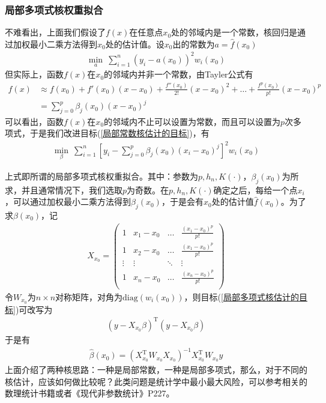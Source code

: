         \subsubsection{局部多项式核权重拟合}
            \par
            不难看出，上面我们假设了$f(x)$在任意点$x_0$处的邻域内是一个常数，核回归是通过加权最小二乘方法得到$x_0$处的估计值。设$x_0$出的常数为$a = \hat{f}(x_0)$
            \begin{align}
            \label{局部常数核估计的目标}
            \min_a \ \sum_{i=1}^n (y_i - a(x_0))^2w_i(x_0)
            \end{align}
            但实际上，函数$f(x)$在$x_0$的邻域内并非一个常数，由Tayler公式有
            \begin{align*}
            f(x) & \approx f(x_0)+ f'(x_0)(x-x_0)+\frac{f''(x_0)}{2!}(x- x_0)^2+\dots+\frac{f^{p}(x_0)}{ p!}(x-x_0)^p \\
            & = \sum_{j = 0}^p\beta_j(x_0)(x-x_0)^j
            \end{align*}
            可以看出，函数$f(x)$在$x_0$的邻域内不止可以设置为常数，而且可以设置为$p$次多项式，于是我们改进目标(\ref{局部常数核估计的目标})，有
            \begin{align}
            \label{局部多项式核估计的目标}
            \min_\beta \ \sum_{i=1}^n \left[ y_i - \sum_{j = 0}^p\beta_j(x_0)(x_i-x_0)^j  \right]^2w_i(x_0)
            \end{align}
            \par
            上式即所谓的局部多项式核权重拟合。其中：参数为$p,h_n,K(\cdot)$，$\beta_j(x_0)$为所求，并且通常情况下，我们选取$p$为奇数。在$p,h_n,K(\cdot)$确定之后，每给一个点$x_i$，可以通过加权最小二乘方法得到$\beta_j(x_0)$，于是会有$x_0$处的估计值$\hat{f}(x_0)$。为了求$\beta(x_0)$，记
            \begin{align*}
            X_{x_0} =
            \begin{pmatrix}
            1 &x_1 - x_0&\dots&\frac{(x_1-x_0)^p}{p!} \\
            1 &x_2 - x_0&\dots&\frac{(x_1-x_0)^p}{p!} \\
            \vdots&\vdots&\ddots&\vdots\\
            1 &x_n - x_0&\dots&\frac{(x_n-x_0)^p}{p!} \\
            \end{pmatrix}
            \end{align*}
            令$W_{x_0}$为$n\times n$对称矩阵，对角为$\mathrm{diag}(w_i(x_0))$，则目标(\ref{局部多项式核估计的目标})可改写为
            \begin{align*}
            (y - X_{x_0}\beta)^\mathrm{T}(y - X_{x_0}\beta)
            \end{align*}
            于是有
            \begin{align*}
            \hat{\beta}(x_0) = (X_{x_0}^\mathrm{T}W_{x_0}X_{x_0})^\mathrm{-1}X_{x_0}^\mathrm{T}W_{x_0}y
            \end{align*}
            上面介绍了两种核思路：一种是局部常数，一种是局部多项式，那么，对于不同的核估计，应该如何做比较呢？此类问题是统计学中最小最大风险，可以参考相关的数理统计书籍或者《现代非参数统计》P227。
